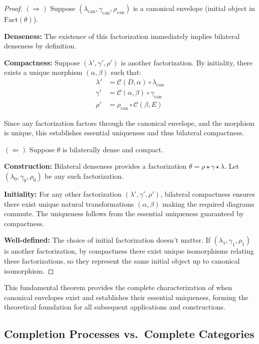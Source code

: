 \documentclass[11pt]{article}
\theoremstyle{plain}
\theoremstyle{definition}
\theoremstyle{remark}
\newcommand{\C}{\mathcal{C}}
\newcommand{\Fact}{\mathrm{Fact}}
\begin{document}
\begin{proof}
$(\Rightarrow)$ Suppose $(\lambda_{\mathrm{can}}, \gamma_{\mathrm{can}}, \rho_{\mathrm{can}})$ is a canonical envelope (initial object in $\Fact(\theta)$).

\textbf{Denseness:} The existence of this factorization immediately implies bilateral denseness by definition.

\textbf{Compactness:} Suppose $(\lambda', \gamma', \rho')$ is another factorization. By initiality, there exists a unique morphism $(\alpha, \beta)$ such that:
\begin{align}
\lambda' &= \C(D, \alpha) \circ \lambda_{\mathrm{can}} \\
\gamma' &= \C(\alpha, \beta) \circ \gamma_{\mathrm{can}} \\
\rho' &= \rho_{\mathrm{can}} \circ \C(\beta, E)
\end{align}

Since any factorization factors through the canonical envelope, and the morphism is unique, this establishes essential uniqueness and thus bilateral compactness.

$(\Leftarrow)$ Suppose $\theta$ is bilaterally dense and compact.

\textbf{Construction:} Bilateral denseness provides a factorization $\theta = \rho \star \gamma \star \lambda$. Let $(\lambda_0, \gamma_0, \rho_0)$ be any such factorization.

\textbf{Initiality:} For any other factorization $(\lambda', \gamma', \rho')$, bilateral compactness ensures there exist unique natural transformations $(\alpha, \beta)$ making the required diagrams commute. The uniqueness follows from the essential uniqueness guaranteed by compactness.

\textbf{Well-defined:} The choice of initial factorization doesn't matter. If $(\lambda_1, \gamma_1, \rho_1)$ is another factorization, by compactness there exist unique isomorphisms relating these factorizations, so they represent the same initial object up to canonical isomorphism.
\end{proof}

This fundamental theorem provides the complete characterization of when canonical envelopes exist and establishes their essential uniqueness, forming the theoretical foundation for all subsequent applications and constructions.

\subsection{Completion Processes vs.\ Complete Categories}\label{ssec:completion-vs-complete}
\end{document}

